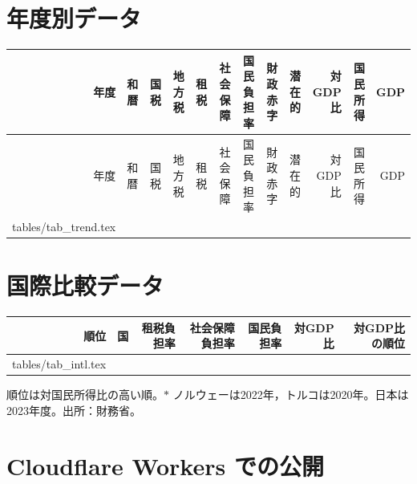 \documentclass[paper=a4,fontsize=10pt]{jlreq}
\makeatletter
\newenvironment{heretable}
  {\par\addvspace{\intextsep}\noindent\begin{minipage}{\linewidth}\centering}
  {\end{minipage}\par\addvspace{\intextsep}}
\newcommand{\tabinput}[1]{\@@input #1 }
\makeatother
\begin{document}
\clearpage
\appendix

\section{年度別データ}\label{app:trend}

\begin{center}
  \label{tab:trend}
\end{center}
\vspace{-\baselineskip}
{\footnotesize
\begin{longtable}{rlrrrrrrrrrr}
  \toprule
  年度 & 和暦 & 国税 & 地方税 & 租税 & 社会保障 & 国民負担率 & 財政赤字 & 潜在的 & 対GDP比 & 国民所得 & GDP \\
  \midrule
  \endfirsthead
  \toprule
  年度 & 和暦 & 国税 & 地方税 & 租税 & 社会保障 & 国民負担率 & 財政赤字 & 潜在的 & 対GDP比 & 国民所得 & GDP \\
  \midrule
  \endhead
  \bottomrule
  \endfoot
  \tabinput{tables/tab_trend.tex}
\end{longtable}
}
\addtocounter{table}{-1}%

\clearpage
\section{国際比較データ}\label{app:intl}

\begin{heretable}
  \label{tab:intl}
  {\footnotesize
  \begin{tabular}{rlrrrrr}
    \toprule
    順位 & 国 & 租税負担率 & 社会保障負担率 & 国民負担率 & 対GDP比 & 対GDP比の順位 \\
    \midrule
    \tabinput{tables/tab_intl.tex}
    \bottomrule
  \end{tabular}}

  \smallskip
  {\footnotesize 順位は対国民所得比の高い順。$*$ ノルウェーは2022年，トルコは2020年。日本は2023年度。出所：財務省\cite{mof2026}。}
\end{heretable}

\clearpage

\section{Cloudflare Workers での公開}\label{app:cloudflare}
\end{document}
